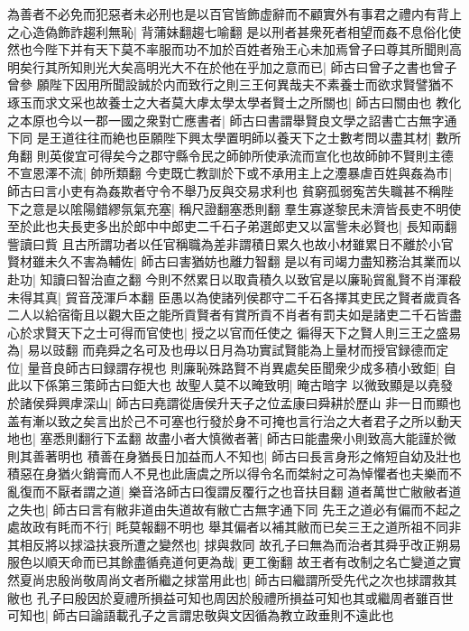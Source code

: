 為善者不必免而犯惡者未必刑也是以百官皆飾虚辭而不顧實外有事君之禮内有背上之心造偽飾詐趨利無恥|{
	背蒲妹翻趨七喻翻}
是以刑者甚衆死者相望而姦不息俗化使然也今陛下并有天下莫不率服而功不加於百姓者殆王心未加焉曾子曰尊其所聞則高明矣行其所知則光大矣高明光大不在於他在乎加之意而已|{
	師古曰曾子之書也曾子曾參}
願陛下因用所聞設誠於内而致行之則三王何異哉夫不素養士而欲求賢譬猶不琢玉而求文采也故養士之大者莫大虖太學太學者賢士之所關也|{
	師古曰關由也}
教化之本原也今以一郡一國之衆對亡應書者|{
	師古曰書謂舉賢良文學之詔書亡古無字通下同}
是王道往往而絶也臣願陛下興太學置明師以養天下之士數考問以盡其材|{
	數所角翻}
則英俊宜可得矣今之郡守縣令民之師帥所使承流而宣化也故師帥不賢則主德不宣恩澤不流|{
	帥所類翻}
今吏既亡教訓於下或不承用主上之灋暴虐百姓與姦為市|{
	師古曰言小吏有為姦欺者守令不舉乃反與交易求利也}
貧窮孤弱寃苦失職甚不稱陛下之意是以隂陽錯繆氛氣充塞|{
	稱尺證翻塞悉則翻}
羣生寡遂黎民未濟皆長吏不明使至於此也夫長吏多出於郎中中郎吏二千石子弟選郎吏又以富訾未必賢也|{
	長知兩翻訾讀曰貲}
且古所謂功者以任官稱職為差非謂積日累久也故小材雖累日不離於小官賢材雖未久不害為輔佐|{
	師古曰害猶妨也離力智翻}
是以有司竭力盡知務治其業而以赴功|{
	知讀曰智治直之翻}
今則不然累日以取貴積久以致官是以廉恥貿亂賢不肖渾殽未得其真|{
	貿音茂渾戶本翻}
臣愚以為使諸列侯郡守二千石各擇其吏民之賢者歲貢各二人以給宿衛且以觀大臣之能所貢賢者有賞所貢不肖者有罰夫如是諸吏二千石皆盡心於求賢天下之士可得而官使也|{
	授之以官而任使之}
徧得天下之賢人則三王之盛易為|{
	易以豉翻}
而堯舜之名可及也毋以日月為功實試賢能為上量材而授官録德而定位|{
	量音良師古曰録謂存視也}
則廉恥殊路賢不肖異處矣臣聞衆少成多積小致鉅|{
	自此以下係第三策師古曰鉅大也}
故聖人莫不以晻致明|{
	晻古暗字}
以微致顯是以堯發於諸侯舜興虖深山|{
	師古曰堯謂從唐侯升天子之位孟康曰舜耕於歷山}
非一日而顯也盖有漸以致之矣言出於己不可塞也行發於身不可掩也言行治之大者君子之所以動天地也|{
	塞悉則翻行下孟翻}
故盡小者大慎微者著|{
	師古曰能盡衆小則致高大能謹於微則其善著明也}
積善在身猶長日加益而人不知也|{
	師古曰長言身形之脩短自幼及壯也}
積惡在身猶火銷膏而人不見也此唐虞之所以得令名而桀紂之可為悼懼者也夫樂而不亂復而不厭者謂之道|{
	樂音洛師古曰復謂反覆行之也音扶目翻}
道者萬世亡敝敝者道之失也|{
	師古曰言有敝非道由失道故有敝亡古無字通下同}
先王之道必有偏而不起之處故政有眊而不行|{
	眊莫報翻不明也}
舉其偏者以補其敝而已矣三王之道所祖不同非其相反將以捄溢扶衰所遭之變然也|{
	捄與救同}
故孔子曰無為而治者其舜乎改正朔易服色以順天命而已其餘盡循堯道何更為哉|{
	更工衡翻}
故王者有改制之名亡變道之實然夏尚忠殷尚敬周尚文者所繼之捄當用此也|{
	師古曰繼謂所受先代之次也捄謂救其敝也}
孔子曰殷因於夏禮所損益可知也周因於殷禮所損益可知也其或繼周者雖百世可知也|{
	師古曰論語載孔子之言謂忠敬與文因循為教立政垂則不遠此也}
